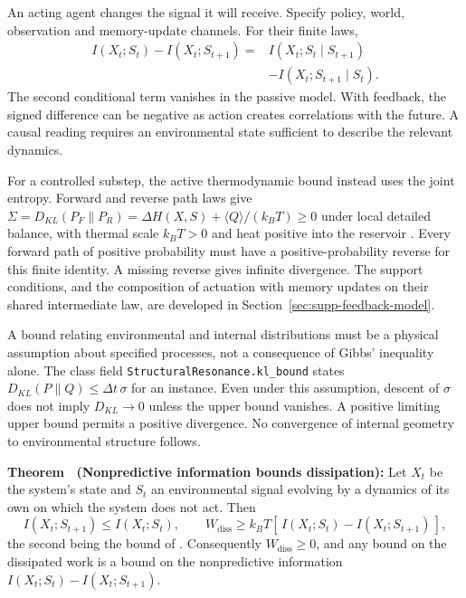 \documentclass{article}
\renewcommand{\cite}[1]{\citep{#1}}
\begin{document}
An acting agent changes the signal it will receive. Specify policy, world, observation and memory-update channels. For their finite laws,
\begin{equation}
\begin{split}
 I(X_t;S_t)-I(X_t;S_{t+1})
 ={}&I(X_t;S_t\mid S_{t+1})\\
 &-I(X_t;S_{t+1}\mid S_t).
\end{split}
\label{eq:feedback-information}
\end{equation}
The second conditional term vanishes in the passive model. With feedback, the signed difference can be negative as action creates correlations with the future. A causal reading requires an environmental state sufficient to describe the relevant dynamics.

For a controlled substep, the active thermodynamic bound instead uses the joint entropy. Forward and reverse path laws give
$\Sigma=D_{KL}(P_F\|P_R)=\Delta H(X,S)+\langle Q\rangle/(k_BT)\geq0$
under local detailed balance, with thermal scale $k_BT>0$ and heat positive into the reservoir \cite{horowitz2014,ito2013}. Every forward path of positive probability must have a positive-probability reverse for this finite identity. A missing reverse gives infinite divergence. The support conditions, and the composition of actuation with memory updates on their shared intermediate law, are developed in Section~\ref{sec:supp-feedback-model}.

A bound relating environmental and internal distributions must be a physical assumption about specified processes, not a consequence of Gibbs' inequality alone. The class field \nolinkurl{StructuralResonance.kl_bound} states $D_{KL}(P\|Q)\leq\Delta t\,\sigma$ for an instance. Even under this assumption, descent of $\sigma$ does not imply $D_{KL}\to0$ unless the upper bound vanishes. A positive limiting upper bound permits a positive divergence. No convergence of internal geometry to environmental structure follows.

\label{thm:supp-predictive}
\textbf{Theorem \thesuppresult\ (Nonpredictive information bounds dissipation):} Let $X_t$ be the system's state and $S_t$ an environmental signal evolving by a dynamics of its own on which the system does not act. Then
\begin{equation}
I(X_t ; S_{t+1}) \le I(X_t ; S_t), \qquad W_{\mathrm{diss}} \ge k_B T \left[\, I(X_t ; S_t) - I(X_t ; S_{t+1}) \,\right],
\end{equation}
the second being the bound of \cite{still2012}. Consequently $W_{\mathrm{diss}} \ge 0$, and any bound on the dissipated work is a bound on the nonpredictive information $I(X_t;S_t) - I(X_t;S_{t+1})$.
\end{document}

